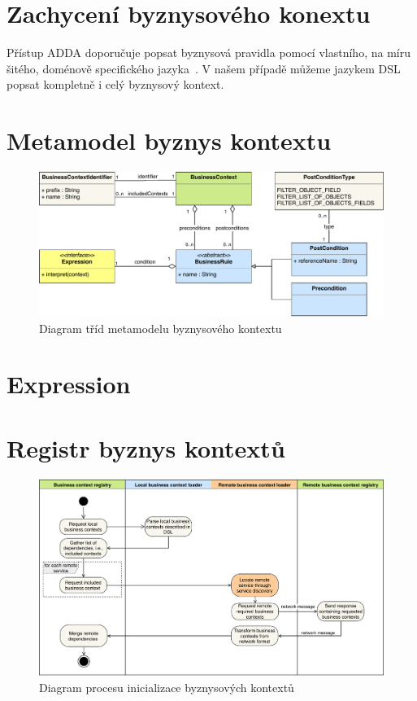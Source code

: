 \section{Zachycení byznysového konextu}

Přístup \gls{ADDA} doporučuje popsat byznysová pravidla pomocí
vlastního, na míru šitého, doménově specifického jazyka~\cite{cemus2015automated}.
V našem případě můžeme jazykem \gls{DSL} popsat kompletně i celý
byznysový kontext.

\section{Metamodel byznys kontextu}\label{sec:metamodel}

\begin{figure}
    \centering
    \includegraphics[keepaspectratio=true, width=\linewidth]{figures/business-context-metamodel.pdf}
    \caption{Diagram tříd metamodelu byznysového kontextu}
    \label{fig:business-context-metamodel}
\end{figure} %

\section{Expression}

\section{Registr byznys kontextů}

\begin{figure}
    \centering
    \includegraphics[keepaspectratio=true, width=0.8\linewidth]{figures/business-context-loading.pdf}
    \caption{Diagram procesu inicializace byznysových kontextů}
    \label{fig:business-context-loading}
\end{figure} %

